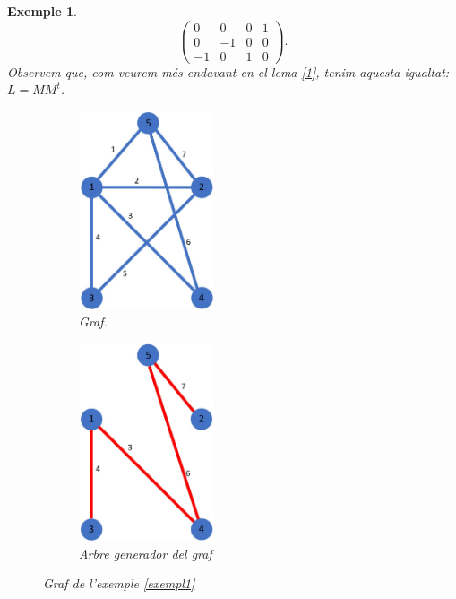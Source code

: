 \documentclass{article}
\newtheorem{example}{Exemple}[section]
\begin{document}
\begin{example}
$$\begin{pmatrix}
            0  & 0  & 0 & 1 \\
            0  & -1 & 0 & 0 \\
            -1 & 0  & 1 & 0
        \end{pmatrix}.
    $$
    Observem que, com veurem més endavant en el lema \ref{1}, tenim aquesta igualtat: $L=MM^t$.
    \begin{figure}[H]
        \centering
        \begin{subfigure}{.45\textwidth}
            \centering
            \includegraphics[width=4cm]{Imatges/exemple1.jpg}
            \caption{Graf.}
            \label{g1}
        \end{subfigure}
        \begin{subfigure}{.45\textwidth}
            \centering
            \includegraphics[width=4cm]{Imatges/exemple2.jpg}
            \caption{Arbre generador del graf}
            \label{g2}
        \end{subfigure}
        \caption{Graf de l'exemple \ref{exempl1}}
    \end{figure}
\end{example}
\end{document}
